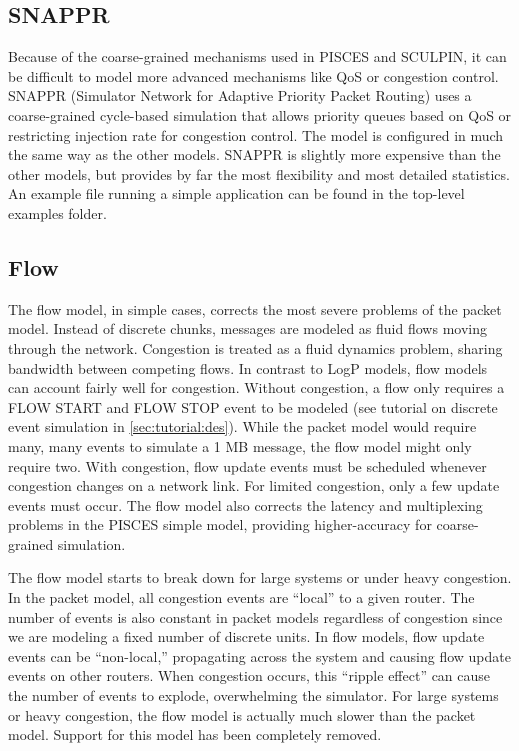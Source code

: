 \subsection{SNAPPR}
Because of the coarse-grained mechanisms used in PISCES and SCULPIN, it can be difficult to model more advanced mechanisms like QoS or congestion control. 
SNAPPR (Simulator Network for Adaptive Priority Packet Routing) uses a coarse-grained cycle-based simulation that allows priority queues based on QoS or restricting injection rate for congestion control. The model is configured in much the same way as the other models.  SNAPPR is slightly more expensive than the other models, but provides by far the most flexibility and most detailed statistics.
An example file running a simple application can be found in the top-level examples folder.

\subsection{Flow}
\label{subsec:tutorial:flow}
The flow model, in simple cases, corrects the most severe problems of the packet model.
Instead of discrete chunks, messages are modeled as fluid flows moving through the network.
Congestion is treated as a fluid dynamics problem, sharing bandwidth between competing flows.
In contrast to LogP models, flow models can account fairly well for congestion.
Without congestion, a flow only requires a FLOW START and FLOW STOP event to be modeled (see tutorial on discrete event simulation in \ref{sec:tutorial:des}).
While the packet model would require many, many events to simulate a 1 MB message, the flow model might only require two.
With congestion, flow update events must be scheduled whenever congestion changes on a network link.  
For limited congestion, only a few update events must occur.
The flow model also corrects the latency and multiplexing problems in the PISCES simple model, providing higher-accuracy for coarse-grained simulation.

The flow model starts to break down for large systems or under heavy congestion.
In the packet model, all congestion events are ``local'' to a given router.  
The number of events is also constant in packet models regardless of congestion since we are modeling a fixed number of discrete units.
In flow models, flow update events can be ``non-local,'' propagating across the system and causing flow update events on other routers.
When congestion occurs, this ``ripple effect'' can cause the number of events to explode, overwhelming the simulator.
For large systems or heavy congestion, the flow model is actually much slower than the packet model. Support for this model has been completely removed.


